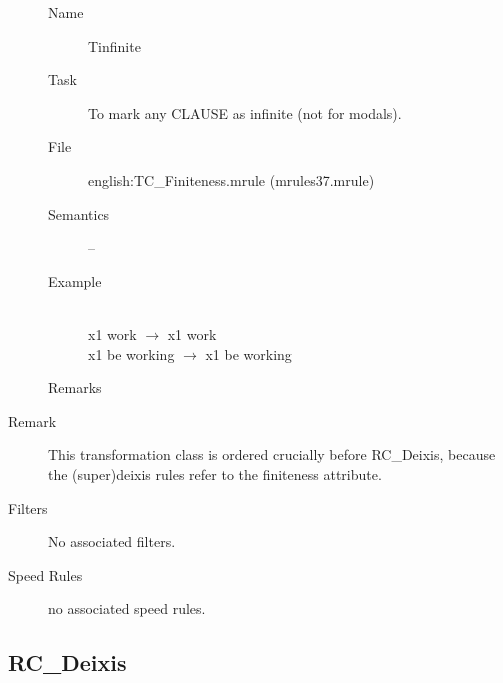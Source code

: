 \begin{description}
\vspace{1 cm}
\begin{description}
\item[Name] Tinfinite
\item[Task] To mark any CLAUSE as infinite (not for modals).
\item[File] english:TC\_Finiteness.mrule (mrules37.mrule)
\item[Semantics] --
\item[Example] \mbox{}\\
 x1 work $\rightarrow$ x1 work\\
x1 be working $\rightarrow$ x1 be working
\item[Remarks] 
\end{description}

\item[Remark] This transformation class is ordered crucially before RC\_Deixis, 
because the (super)deixis rules refer to the finiteness attribute.
\item [Filters] No associated filters.
\item [Speed Rules] no associated speed rules.
\end{description}

\newpage
\subsection{RC\_Deixis}

